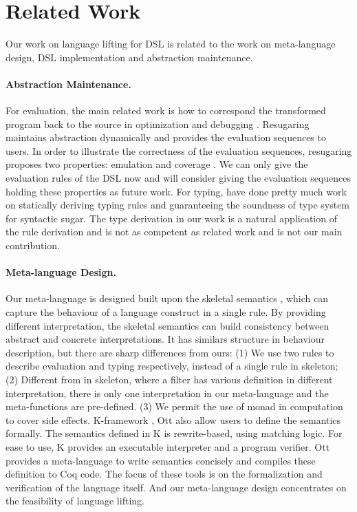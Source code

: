 \section{Related Work}

Our work on language lifting for DSL is related to the work on meta-language design, DSL implementation and abstraction maintenance.

\paragraph{Abstraction Maintenance.}
For evaluation, the main related work is how to correspond the transformed program back to the source in optimization and debugging \cite{resugar,abs-1,abs-2,abs-3}.
Resugaring maintains abstraction dynamically and provides the evaluation sequences to users.
In order to illustrate the correctness of the evaluation sequences, resugaring proposes two properties: emulation and coverage \cite{resugar}.
We can only give the evaluation rules of the DSL now and 
 will consider giving the evaluation sequences holding these properties as future work.
For typing, \cite{infer-types,type-sound,type-sound-1} have done pretty much work on statically deriving typing rules and guaranteeing the soundness of type system for syntactic sugar.
The type derivation in our work is a natural application of the rule derivation
 and is not as competent as related work and is not our main contribution.

\paragraph{Meta-language Design.}
Our meta-language is designed built upon the skeletal semantics \cite{skeleton},
 which can capture the behaviour of a language construct in a single rule.
By providing different interpretation,
 the skeletal semantics can build consistency between abstract and concrete interpretations.
It has similars structure in behaviour description,
 but there are sharp differences from ours:
(1) We use two rules to describe evaluation and typing respectively, instead of a single rule in skeleton;
(2) Different from in skeleton, where a filter has various definition in different interpretation, 
 there is only one interpretation in our meta-language and the meta-functions are pre-defined.
(3) We permit the use of monad in computation to cover side effects.
K-framework \cite{K-framework}, Ott \cite{Ott} also allow users to define the semantics formally.
The semantics defined in K is rewrite-based, using matching logic.
For ease to use, K provides an executable interpreter and a program verifier.
Ott provides a meta-language to write semantics concisely and compiles these definition to Coq code.
The focus of these tools is on the formalization and verification of the language itself.
And our meta-language design concentrates on the feasibility of language lifting.

